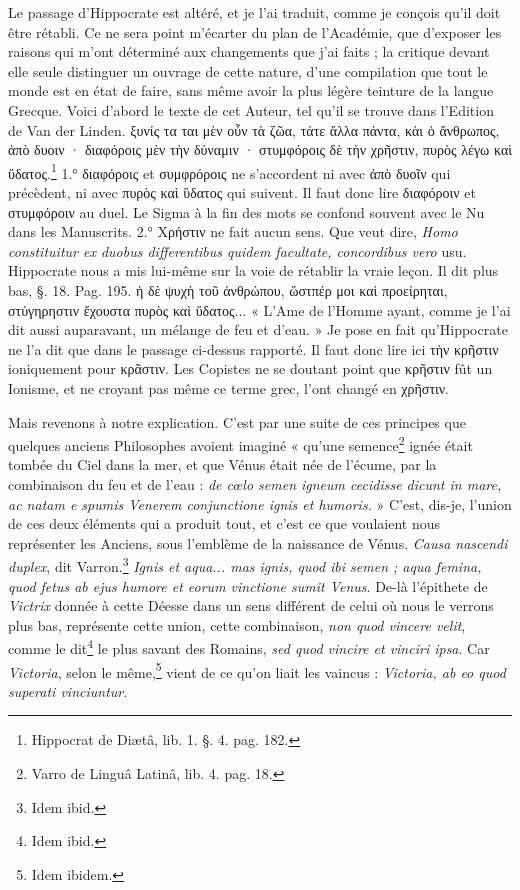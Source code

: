 \documentclass[a4paper, 11pt, oneside, polutonikogreek, french]{article}
\begin{document}
Le passage d'Hippocrate est altéré, et je l'ai traduit, comme je conçois qu'il doit être rétabli. Ce ne sera point m'écarter du plan de l'Académie, que d'exposer les raisons qui m'ont déterminé aux changements que j'ai faits ; la critique devant elle seule distinguer un ouvrage de cette nature, d'une compilation que tout le monde est en état de faire, sans même avoir la plus légère teinture de la langue Grecque. Voici d'abord le texte de cet Auteur, tel qu'il se trouve dans l'Edition de Van der Linden. ξυνίς τα ται μὲν οὖν τὰ ζῶα, τάτε ἄλλα πάντα, κὰι ὁ ἄνθρωπος, ἀπὸ δυοιν · διαφόροις μὲν τὴν δύναμιν · στυμφόροις δὲ τὴν χρῆστιν, πυρὸς λέγω καὶ ὕδατος.\footnote{Hippocrat de Diætâ, lib. 1. §. 4. pag. 182.} 1.° διαφόροις et συμφρόροις ne s'accordent ni avec ἀπὸ δυοῖν qui précèdent, ni avec πυρὸς καὶ ὓδατος qui suivent. Il faut donc lire διαφόροιν et στυμφόροιν au duel. Le Sigma à la fin des mots se confond souvent avec le Nu dans les Manuscrits. 2.° Χρήστιν ne fait aucun sens. Que veut dire, \emph{Homo constituitur ex duobus differentibus quidem facultate, concordibus vero} usu. Hippocrate nous a mis lui-même sur la voie de rétablir la vraie leçon. Il dit plus bas, §. 18. Pag. 195. ἡ δὲ ψυχὴ τοῦ ἀνθρώπου, ὥστπέρ μοι καὶ προείρηται, στὐγηρηστιν ἔχουστα πυρὸς καὶ ὕδατος... « L'Ame de l'Homme ayant, comme je l'ai dit aussi auparavant, un mélange de feu et d'eau. » Je pose en fait qu'Hippocrate ne l'a dit que dans le passage ci-dessus rapporté. Il faut donc lire ici τὴν κρῆστιν ioniquement pour κρᾶστιν. Les Copistes ne se doutant point que κρῆστιν fût un Ionisme, et ne croyant pas même ce terme grec, l'ont changé en χρῆστιν.

Mais revenons à notre explication. C'est par une suite de ces principes que quelques anciens Philosophes avoient imaginé « qu'une semence\footnote{Varro de Linguâ Latinâ, lib. 4. pag. 18.} ignée était tombée du Ciel dans la mer, et que Vénus était née de l'écume, par la combinaison du feu et de l'eau : \emph{de cœlo semen igneum cecidisse dicunt in mare, ac natam e spumis Venerem conjunctione ignis et humoris.} » C'est, dis-je, l'union de ces deux éléments qui a produit tout, et c'est ce que voulaient nous représenter les Anciens, sous l'emblème de la naissance de Vénus. \emph{Causa nascendi duplex}, dit Varron.\footnote{Idem ibid.} \emph{Ignis et aqua... mas ignis, quod ibi semen ; aqua femina, quod fetus ab ejus humore et eorum vinctione sumit Venus}. De-là l'épithete de \emph{Victrix} donnée à cette Déesse dans un sens différent de celui où nous le verrons plus bas, représente cette union, cette combinaison, \emph{non quod vincere velit}, comme le dit\footnote{Idem ibid.} le plus savant des Romains, \emph{sed quod vincire et vinciri ipsa}. Car \emph{Victoria}, selon le même,\footnote{Idem ibidem.} vient de ce qu'on liait les vaincus : \emph{Victoria, ab eo quod superati vinciuntur}.
\end{document}

